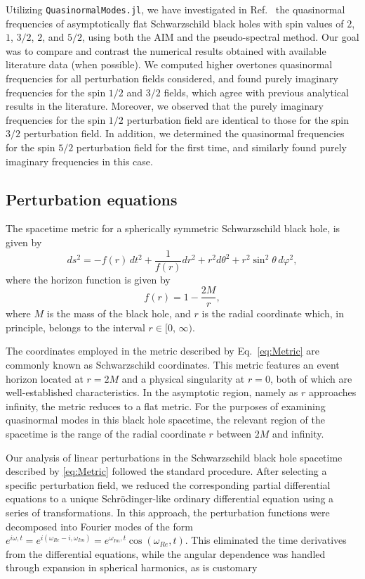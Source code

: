 Utilizing \texttt{QuasinormalModes.jl}, we have investigated in Ref.~\cite{Mamani2022} the quasinormal frequencies of asymptotically flat Schwarzschild black holes with spin values of $2$, $1$, $3/2$, $2$, and $5/2$, using both the AIM and the pseudo-spectral method. Our goal was to compare and contrast the numerical results obtained with available literature data (when possible). We computed higher overtones quasinormal frequencies for all perturbation fields considered, and found purely imaginary frequencies for the spin $1/2$ and $3/2$ fields, which agree with previous analytical results in the literature. Moreover, we observed that the purely imaginary frequencies for the spin $1/2$ perturbation field are identical to those for the spin $3/2$ perturbation field. In addition, we determined the quasinormal frequencies for the spin $5/2$ perturbation field for the first time, and similarly found purely imaginary frequencies in this case.

\subsection{Perturbation equations}

The spacetime metric for a spherically symmetric Schwarzschild black hole, is given by \cite{Schwarzschild:1916uq}
%
\begin{equation}\label{eq:Metric}
  ds^2=-f(r)\,dt^2+\frac{1}{f(r)}dr^2+r^2d\theta^2+
  r^2\sin^2{\theta}\,d\varphi^2,
\end{equation}
%
where the horizon function is given by
%
\begin{equation}\label{EqHoriFuncHayward}
  f(r)=1-\frac{2M}{r},
\end{equation}
%
where $M$ is the mass of the black hole, and $r$ is the radial coordinate which, in principle, belongs to the interval $r\in [0,\, \infty)$.

The coordinates employed in the metric described by Eq.~\eqref{eq:Metric} are commonly known as Schwarzschild coordinates. This metric features an event horizon located at $r=2M$ and a physical singularity at $r=0$, both of which are well-established characteristics. In the asymptotic region, namely as $r$ approaches infinity, the metric reduces to a flat metric. For the purposes of examining quasinormal modes in this black hole spacetime, the relevant region of the spacetime is the range of the radial coordinate $r$ between $2M$ and infinity.

Our analysis of linear perturbations in the Schwarzschild black hole spacetime described by \eqref{eq:Metric} followed the standard procedure. After selecting a specific perturbation field, we reduced the corresponding partial differential equations to a unique Schrödinger-like ordinary differential equation using a series of transformations. In this approach, the perturbation functions were decomposed into Fourier modes of the form $e^{i\omega,t}=e^{i(\omega_{Re}-i,\omega_{Im})}=e^{\omega_{Im},t}\cos{\left(\omega_{Re},t\right)}$. This eliminated the time derivatives from the differential equations, while the angular dependence was handled through expansion in spherical harmonics, as is customary

